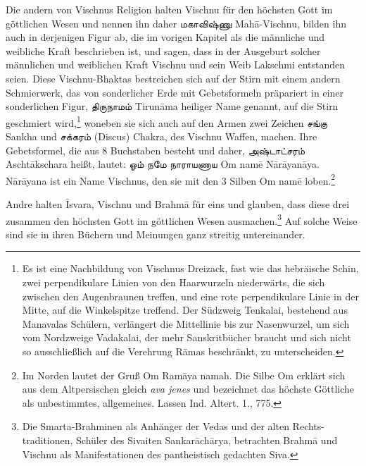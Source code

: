 \documentclass{article}
\newcommand{\TamilText}[1]{\texttamil{#1}}
\newcommand{\tam}[1]{\TamilText{#1}}
\begin{document}
Die andern von Vischnus Religion halten Vischnu für den höchsten Gott im göttlichen Wesen und nennen ihn daher \tam{மகாவிஷ்ணு} Mah\={a}-Vischnu, bilden ihn auch in derjenigen Figur ab, die im vorigen Kapitel als die männliche und weibliche Kraft beschrieben ist, und sagen, dass in der Ausgeburt solcher männlichen und weiblichen Kraft Vischnu und sein Weib Lakschmi entstanden seien. Diese Vischnu-Bhaktas bestreichen sich auf der Stirn mit einem andern Schmierwerk, das von sonderlicher Erde mit Gebetsformeln präpariert in einer sonderlichen Figur, \tam{திருநாமம்} Tirun\={a}ma heiliger Name genannt, auf die Stirn geschmiert wird,\footnote{Es ist eine Nachbildung von Vischnus Dreizack, fast wie das hebräische Schin, zwei perpendikulare Linien von den Haarwurzeln niederwärts, die sich zwischen den Augenbraunen treffen, und eine rote perpendikulare Linie in der Mitte, auf die Winkelspitze treffend. Der Südzweig Tenkalai, bestehend aus Manavalas Schülern, verlängert die Mittellinie bis zur Nasenwurzel, um sich vom Nordzweige Vadakalai, der mehr Sanskritbücher braucht und sich nicht so ausschließlich auf die Verehrung R\={a}mas beschränkt, zu unterscheiden.} woneben sie sich auch auf den Armen zwei Zeichen \tam{சங்கு} Sankha und \tam{சக்கரம்} (Discus) Chakra, des Vischnu Waffen, machen. Ihre Gebetsformel, die aus 8 Buchstaben besteht und daher, \tam{அஷ்டாட்சரம்} Ascht\={a}kschara heißt, lautet: \tam{ஓம்} \tam{நமே} \tam{நாராயணாய} Om nam\={e} N\={a}r\={a}yan\={a}ya. N\={a}r\={a}yana ist ein Name Vischnus, den sie mit den 3 Silben Om nam\={e} loben.\footnote{Im Norden lautet der Gruß Om Ram\={a}ya namah. Die Silbe Om erklärt sich aus dem Altpersischen gleich \emph{ava jenes} und bezeichnet das höchste Göttliche als unbestimmtes, allgemeines. Lassen Ind. Altert. 1., 775.}

Andre halten \={I}svara, Vischnu und Brahm\={a} für eins und glauben, dass diese drei zusammen den höchsten Gott im göttlichen Wesen ausmachen.\footnote{Die Smarta-Brahminen als Anhänger der Vedas und der alten Rechts-traditionen, Schüler des Sivaiten Sankar\={a}ch\={a}rya, betrachten Brahm\={a} und Vischnu als Manifestationen des pantheistisch gedachten Siva.} Auf solche Weise sind sie in ihren Büchern und Meinungen ganz streitig untereinander.
\end{document}
